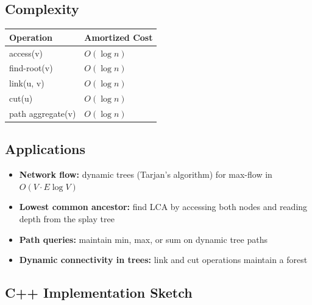 \subsection{Complexity}

\begin{center}
\begin{tabular}{ll}
\toprule
Operation & Amortized Cost \\
\midrule
access(v) & $O(\log n)$ \\
find-root(v) & $O(\log n)$ \\
link(u, v) & $O(\log n)$ \\
cut(u) & $O(\log n)$ \\
path aggregate(v) & $O(\log n)$ \\
\bottomrule
\end{tabular}
\end{center}

\subsection{Applications}

\begin{itemize}
\item \textbf{Network flow:} dynamic trees (Tarjan's algorithm) for max-flow in $O(V \cdot E \log V)$
\item \textbf{Lowest common ancestor:} find LCA by accessing both nodes and reading depth from the splay tree
\item \textbf{Path queries:} maintain min, max, or sum on dynamic tree paths
\item \textbf{Dynamic connectivity in trees:} link and cut operations maintain a forest
\end{itemize}

\subsection{C++ Implementation Sketch}

